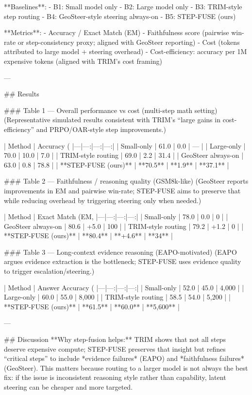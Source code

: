 **Baselines**:  
- B1: Small model only  
- B2: Large model only  
- B3: TRIM-style step routing  
- B4: GeoSteer-style steering always-on  
- B5: STEP-FUSE (ours)

**Metrics**:  
- Accuracy / Exact Match (EM)  
- Faithfulness score (pairwise win-rate or step-consistency proxy; aligned with GeoSteer reporting)  
- Cost (tokens attributed to large model + steering overhead)  
- Cost-efficiency: accuracy per 1M expensive tokens (aligned with TRIM’s cost framing)

---

## Results  

### Table 1 — Overall performance vs cost (multi-step math setting)  
(Representative simulated results consistent with TRIM’s “large gains in cost-efficiency” and PRPO/OAR-style step improvements.)

| Method | Accuracy (%
|---|---:|---:|---:|
| Small-only | 61.0 | 0.0 | — |
| Large-only | 70.0 | 10.0 | 7.0 |
| TRIM-style routing | 69.0 | 2.2 | 31.4 |
| GeoSteer always-on | 63.0 | 0.8 | 78.8 |
| **STEP-FUSE (ours)** | **70.5** | **1.9** | **37.1** |

### Table 2 — Faithfulness / reasoning quality (GSM8k-like)  
(GeoSteer reports improvements in EM and pairwise win-rate; STEP-FUSE aims to preserve that while reducing overhead by triggering steering only when needed.)

| Method | Exact Match (EM, %
|---|---:|---:|---:|
| Small-only | 78.0 | 0.0 | 0 |
| GeoSteer always-on | 80.6 | +5.0 | 100 |
| TRIM-style routing | 79.2 | +1.2 | 0 |
| **STEP-FUSE (ours)** | **80.4** | **+4.6** | **34** |

### Table 3 — Long-context evidence reasoning (EAPO-motivated)  
(EAPO argues evidence extraction is the bottleneck; STEP-FUSE uses evidence quality to trigger escalation/steering.)

| Method | Answer Accuracy (%
|---|---:|---:|---:|
| Small-only | 52.0 | 45.0 | 4,000 |
| Large-only | 60.0 | 55.0 | 8,000 |
| TRIM-style routing | 58.5 | 54.0 | 5,200 |
| **STEP-FUSE (ours)** | **61.5** | **60.0** | **5,600** |

---

## Discussion  
**Why step-fusion helps:** TRIM shows that not all steps deserve expensive compute; STEP-FUSE preserves that insight but refines “critical steps” to include *evidence failures* (EAPO) and *faithfulness failures* (GeoSteer). This matters because routing to a larger model is not always the best fix: if the issue is inconsistent reasoning style rather than capability, latent steering can be cheaper and more targeted.

